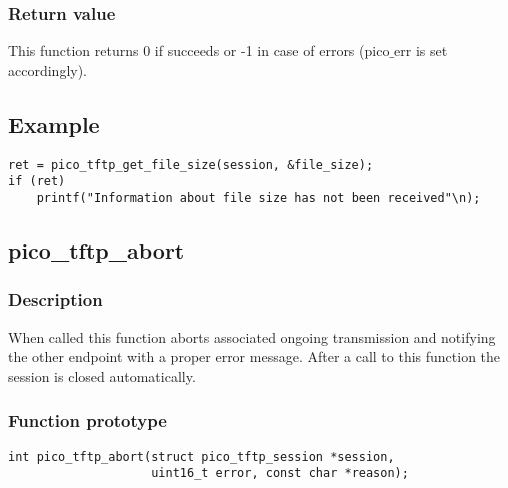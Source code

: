 \subsubsection*{Return value}
This function returns 0 if succeeds or -1 in case of errors (pico$\_$err is set accordingly).

\subsection*{Example}
\begin{verbatim}
ret = pico_tftp_get_file_size(session, &file_size);
if (ret)
    printf("Information about file size has not been received"\n);
\end{verbatim}


\subsection{pico\_tftp\_abort}
\subsubsection*{Description}
When called this function aborts associated ongoing transmission and notifying the other endpoint with a proper error message. After a call to this function the session is closed automatically.

\subsubsection*{Function prototype}
\begin{verbatim}
int pico_tftp_abort(struct pico_tftp_session *session,
                    uint16_t error, const char *reason);
\end{verbatim}

